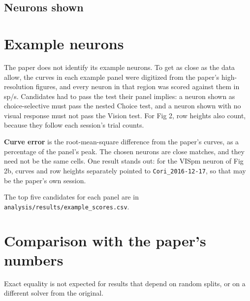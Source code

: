 \documentclass[11pt,a4paper]{article}
\begin{document}
\subsection{Neurons shown}
\begin{table}[H]\centering\footnotesize

\caption{Neurons in the assignment figures. Raster neurons have the most reliable contralateral stimulus response in a session with at least 15 correct trials per side.}
\end{table}

\section{Example neurons}
\label{sec:neurons}

The paper does not identify its example neurons. To get as close as the data allow, the curves in each example panel were digitized from the paper's high-resolution figures, and every neuron in that region was scored against them in sp/s. Candidates had to pass the test their panel implies: a neuron shown as choice-selective must pass the nested Choice test, and a neuron shown with no visual response must not pass the Vision test. For Fig 2, row heights also count, because they follow each session's trial counts.

\textbf{Curve error} is the root-mean-square difference from the paper's curves, as a percentage of the panel's peak. The chosen neurons are close matches, and they need not be the same cells. One result stands out: for the VISpm neuron of Fig 2b, curves and row heights separately pointed to \texttt{Cori\_2016-12-17}, so that may be the paper's own session.



The top five candidates for each panel are in \texttt{analysis/results/example\_scores.csv}.

\section{Comparison with the paper's numbers}
\label{sec:numbers}



Exact equality is not expected for results that depend on random splits, or on a different solver from the original.

\begin{table}[H]\centering\scriptsize

\caption{Neurons per region against Extended Data Table 1. The total is within 2\%, but the released labels do not reproduce the table region by region. Re-deriving labels from the atlas at each channel's position was much worse (total error of 8,505 neurons against 790), so the released labels were kept.}
\end{table}
\end{document}
